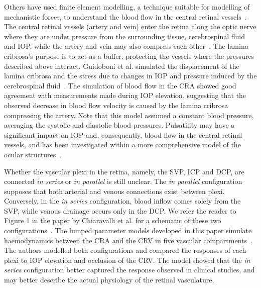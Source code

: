 \documentclass{article}
\begin{document}
Others have used finite element modelling, a technique suitable for modelling of mechanistic forces, to understand the blood flow in the central retinal vessels~\cite{Guidoboni_2014,Jin_2020}.
The central retinal vessels (artery and vein) enter the retina along the optic nerve where they are under pressure from the surrounding tissue, cerebrospinal fluid and IOP, while the artery and vein may also compress each other~\cite{Nickells_2012}.
The lamina cribrosa's purpose is to act as a buffer, protecting the vessels where the pressures described above interact.
Guidoboni et al. simulated the displacement of the lamina cribrosa and the stress due to changes in IOP and pressure induced by the cerebrospinal fluid~\cite{Guidoboni_2014}.
The simulation of blood flow in the CRA showed good agreement with measurements made during IOP elevation, suggesting that the observed decrease in blood flow velocity is caused by the lamina cribrosa compressing the artery.
Note that this model assumed a constant blood pressure, averaging the systolic and diastolic blood pressures.
Pulsatility may have a significant impact on IOP and, consequently, blood flow in the central retinal vessels, and has been investigated within a more comprehensive model of the ocular structures~\cite{Jin_2020}.

Whether the vascular plexi in the retina, namely, the SVP, ICP and DCP, are connected \textit{in series} or \textit{in parallel} is still unclear.
The \textit{in parallel} configuration supposes that both arterial and venous connections exist between plexi.
Conversely, in the \textit{in series} configuration, blood inflow comes solely from the SVP, while venous drainage occurs only in the DCP.
We refer the reader to Figure 1 in the paper by Chiaravalli et al. for a schematic of these two configurations~\cite{Chiaravalli_2021}.
The lumped parameter models developed in this paper simulate haemodynamics between the CRA and the CRV in five vascular compartments~\cite{Chiaravalli_2021}.
The authors modelled both configurations and compared the responses of each plexi to IOP elevation and occlusion of the CRV.
The model showed that the \textit{in series} configuration better captured the response observed in clinical studies, and may better describe the actual physiology of the retinal vasculature.
\end{document}
